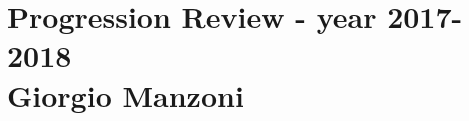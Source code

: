 \documentclass[letterpaper]{report}
\begin{document}
\chapter*{Progression Review - year 2017-2018  \\ $\text{ } $ \\ Giorgio Manzoni}
\end{document}
